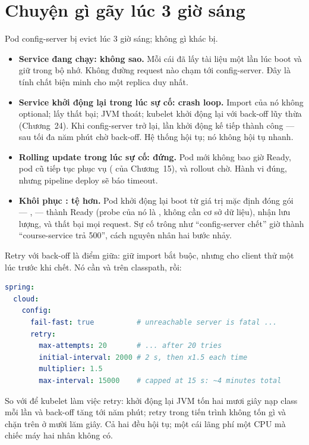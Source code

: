\section{Chuyện gì gãy lúc 3 giờ sáng}

Pod config-server bị evict lúc 3 giờ sáng; không gì khác bị.

\begin{itemize}
  \item \textbf{Service đang chạy: không sao.} Mỗi cái đã lấy tài liệu
  một lần lúc boot và giữ trong bộ nhớ. Không đường request nào chạm
  tới config-server. Đây là tính chất biện minh cho một replica duy
  nhất.
  \item \textbf{Service khởi động lại trong lúc sự cố: crash loop.}
  Import của nó không optional; lấy thất bại; JVM thoát; kubelet khởi
  động lại với back-off lũy thừa (Chương~24). Khi config-server trở
  lại, lần khởi động kế tiếp thành công --- sau tối đa năm phút chờ
  back-off. Hệ thống hội tụ; nó không hội tụ nhanh.
  \item \textbf{Rolling update trong lúc sự cố: đứng.} Pod mới không bao
  giờ Ready, pod cũ tiếp tục phục vụ ( của
  Chương~15), và rollout chờ. Hành vi đúng, nhưng pipeline deploy sẽ
  báo timeout.
  \item \textbf{Khôi phục : tệ hơn.} Pod khởi động lại
  boot từ giá trị mặc định đóng gói --- ,
   --- thành Ready (probe của nó là
  , không cần cơ sở dữ liệu), nhận lưu lượng, và
  thất bại mọi request. Sự cố trông như ``config-server chết'' giờ thành
  ``course-service trả 500'', cách nguyên nhân hai bước nhảy.
\end{itemize}

Retry với back-off là điểm giữa: giữ import bắt buộc, nhưng cho client
thử một lúc trước khi chết. Nó cần  và
 trên classpath, rồi:

\begin{lstlisting}[language=yaml]
spring:
  cloud:
    config:
      fail-fast: true          # unreachable server is fatal ...
      retry:
        max-attempts: 20       # ... after 20 tries
        initial-interval: 2000 # 2 s, then x1.5 each time
        multiplier: 1.5
        max-interval: 15000    # capped at 15 s: ~4 minutes total
\end{lstlisting}

So với để kubelet làm việc retry: khởi động lại JVM tốn hai mươi giây
nạp class mỗi lần và back-off tăng tới năm phút; retry trong tiến trình
không tốn gì và chặn trên ở mười lăm giây. Cả hai đều hội tụ; một cái
lãng phí một CPU mà chiếc máy hai nhân không có.


